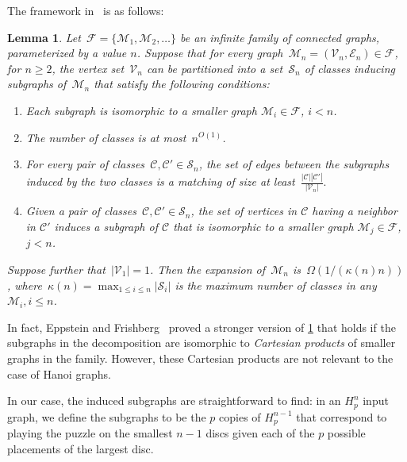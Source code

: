 \documentclass[
final
]{dmtcs-episciences}
\newtheorem{lemma}[theorem]{Lemma}
\begin{document}
The framework in~\cite{eppfrishtri} is as follows:
\begin{lemma}
\label{lem:eppfrishfw}
Let~$\mathcal{F} = \{\mathcal{M}_1, \mathcal{M}_2, \dots\}$ be an infinite family of connected graphs, parameterized by a value $n$. Suppose that for every graph~$\mathcal{M}_n = (\mathcal{V}_n, \mathcal{E}_n) \in \mathcal{F}$, for $n \geq 2$, the vertex set~$\mathcal{V}_n$ can be partitioned into a set~$\mathcal{S}_n$ of classes inducing subgraphs of~$\mathcal{M}_n$ that satisfy the following conditions:
\begin{enumerate}
\item\label{addcondcart} Each subgraph is isomorphic to a smaller graph $\mathcal{M}_{i} \in \mathcal{F}$, $i < n$.
\item\label{addcondnum} The number of classes is at most~$n^{O(1)}$.
\item\label{addcondmatch} For every pair of classes~$\mathcal{C}, \mathcal{C'}\in \mathcal{S}_n$, the set of edges between the subgraphs induced by the two classes is a matching of size at least~$\frac{|\mathcal{C}||\mathcal{C'}|}{|\mathcal{V}_n|}.$
\item\label{addcondbdry} Given a pair of classes~$\mathcal{C}, \mathcal{C'} \in \mathcal{S}_n$, the set of vertices in $\mathcal{C}$ having a neighbor in $\mathcal{C'}$ induces a subgraph of $\mathcal{C}$ that is isomorphic to a smaller graph $\mathcal{M}_{j} \in \mathcal{F}$, $j < n$.
\end{enumerate}

Suppose further that~$|\mathcal{V}_1| = 1$. Then the expansion of~$\mathcal{M}_n$ is~$\Omega(1/(\kappa(n)n))$, where~$\kappa(n) = \max_{1\leq i\leq n}|\mathcal{S}_i|$ is the maximum number of classes in any~$\mathcal{M}_i, i\leq n$.
\end{lemma}

In fact, Eppstein and Frishberg~\citep{eppfrishtri} proved a stronger version of \cref{lem:eppfrishfw} that holds if the subgraphs in the decomposition are isomorphic to \emph{Cartesian products} of smaller graphs in the family. However, these Cartesian products are not relevant to the case of Hanoi graphs.

In our case, the induced subgraphs are straightforward to find: in an $H_p^n$ input graph, we define the subgraphs to be the $p$ copies of $H_p^{n-1}$ that correspond to playing the puzzle on the smallest $n - 1$ discs given each of the $p$ possible placements of the largest disc.
\end{document}
